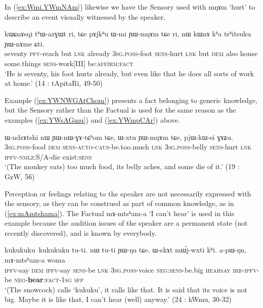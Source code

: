 \documentclass[oldfontcommands,oneside,a4paper,11pt]{article}
\newcommand{\ipa}[1]{{\phon \mbox{#1}}} %
\newcommand{\refb}[1]{(\ref{#1})}
\newcommand{\factual}[1]{\textsc{:fact}}
\begin{document}
In \refb{ex:Wmi.YWmNAm} likewise we have the Sensory used with \ipa{mŋɤm} `hurt' to describe an event visually witnessed by the speaker.

\begin{exe}
\ex \label{ex:Wmi.YWmNAm}
\gll
\ipa{kɯɕnɤsqi} 	\ipa{tʰɯ-azɣɯt} 	\ipa{ri,} \ipa{tɕe} 	\ipa{pɤjkʰu} 	\ipa{ɯ-mi} 	\ipa{ɲɯ-mŋɤm} 	\ipa{tɕe} 	\ipa{ri,} 	\ipa{nɯ} 	\ipa{kɯnɤ} 	\ipa{kʰa} 	\ipa{tsʰitsuku} 	\ipa{ɲɯ-nɤme} 	\ipa{ɕti.} \\
seventy \textsc{pfv}-reach but \textsc{lnk} already \textsc{3sg.poss}-foot \textsc{sens}-hurt \textsc{lnk} but \textsc{dem} also house some.things \textsc{sens}-work[III] be:\textsc{affirm}\factual{} \\
\glt `He is seventy, his foot hurts already, but even like that he does all sorts of work at home.' (14 : tApitaRi, 49-50)
\end{exe}

Example \refb{ex:YWNWGAtChom} presents a fact belonging to generic knowledge, but the Sensory rather than the Factual is used for the same reason as the examples \refb{ex:YWsAGmu} and \refb{ex:YWmpCAr} above.

\begin{exe}
\ex \label{ex:YWNWGAtChom}
\gll
\ipa{ɯ-ndzɤtshi}  	\ipa{nɯ}  	\ipa{ɲɯ-nɯ-ɣɤ-tɕʰom}  	\ipa{tɕe,}  	\ipa{ɯ-xtu}  	\ipa{ɲɯ-mŋɤm}  	\ipa{tɕe,}  	\ipa{pjɯ-kɯ-si}  	\ipa{ɣɤʑu.}  \\
\textsc{3sg.poss}-food \textsc{dem} \textsc{sens-auto-caus}-be.too.much \textsc{lnk} \textsc{3sg.poss}-belly \textsc{sens}-hurt \textsc{lnk} \textsc{ipfv-nmlz}:S/A-die exist:\textsc{sens} \\
\glt `(The monkey eats) too much food, its belly aches, and some die of it.' (19 : GzW, 56)
\end{exe}
  
Perception or feelings relating to the speaker are not necessarily expressed with the sensory, as they can be construed as part of common knowledge, as in \refb{ex:mAmtshama}. The Factual  \ipa{mɤ-mtsʰam-a} `I can't hear' is used in this example because the audition issues of the speaker are a permanent state (not recently discovered), and is known by everybody.

\begin{exe}
\ex \label{ex:mAmtshama}
\gll
\ipa{kukukuku kukukuku} 	\ipa{tu-ti.} 	\ipa{nɯ} 	\ipa{tu-ti} 	\ipa{ɲɯ-ŋu} 	\ipa{tɕe,} 	\ipa{ɯ-skɤt} 	\ipa{mɯ́j-wxti} 	\ipa{kʰi.} 	\ipa{a-pɯ-ŋu,} \ipa{mɤ-mtsʰam-a} 	\ipa{woma} \\
{ } \textsc{ipfv}-say \textsc{dem}  \textsc{ipfv}-say \textsc{sens}-be \textsc{lnk}  \textsc{3sg.poss}-voice \textsc{neg:sens}-be.big \textsc{hearsay} \textsc{irr-ipfv}-be \textsc{neg}-\textbf{hear}:\textsc{fact-1sg} \textsc{sfp} \\
\glt `(The snowcock) calls `kukuku', it calls like that. It is said that its voice is not big. Maybe it is like that, I can't hear (well) anyway.' (24 : kWmu, 30-32)
\end{exe}
\end{document}
